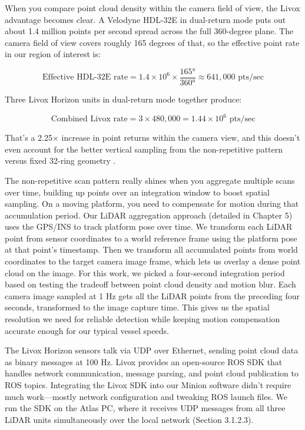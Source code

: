 \documentclass{erauthesis}
\begin{document}
When you compare point cloud density within the camera field of view, the Livox advantage becomes clear.
A Velodyne HDL-32E in dual-return mode puts out about 1.4 million points per second spread across the full 360-degree plane.
The camera field of view covers roughly 165 degrees of that, so the effective point rate in our region of interest is:

$$\text{Effective HDL-32E rate} = 1.4 \times 10^6 \times \frac{165°}{360°} \approx 641,000 \text{ pts/sec}$$

Three Livox Horizon units in dual-return mode together produce:

$$\text{Combined Livox rate} = 3 \times 480,000 = 1.44 \times 10^6 \text{ pts/sec}$$

That's a 2.25× increase in point returns within the camera view, and this doesn't even account for the better vertical sampling from the non-repetitive pattern versus fixed 32-ring geometry \cite{thompson2023}.

The non-repetitive scan pattern really shines when you aggregate multiple scans over time, building up points over an integration window to boost spatial sampling.
On a moving platform, you need to compensate for motion during that accumulation period.
Our \ac{LiDAR} aggregation approach (detailed in Chapter 5) uses the \ac{GPS}/\ac{INS} to track platform pose over time.
We transform each \ac{LiDAR} point from sensor coordinates to a world reference frame using the platform pose at that point's timestamp.
Then we transform all accumulated points from world coordinates to the target camera image frame, which lets us overlay a dense point cloud on the image.
For this work, we picked a four-second integration period based on testing the tradeoff between point cloud density and motion blur.
Each camera image sampled at 1 Hz gets all the \ac{LiDAR} points from the preceding four seconds, transformed to the image capture time.
This gives us the spatial resolution we need for reliable detection while keeping motion compensation accurate enough for our typical vessel speeds.

The Livox Horizon sensors talk via UDP over Ethernet, sending point cloud data as binary messages at 100 Hz.
Livox provides an open-source \ac{ROS} SDK that handles network communication, message parsing, and point cloud publication to \ac{ROS} topics.
Integrating the Livox SDK into our Minion software didn't require much work—mostly network configuration and tweaking \ac{ROS} launch files.
We run the SDK on the Atlas PC, where it receives UDP messages from all three \ac{LiDAR} units simultaneously over the local network (Section 3.1.2.3).
\end{document}
